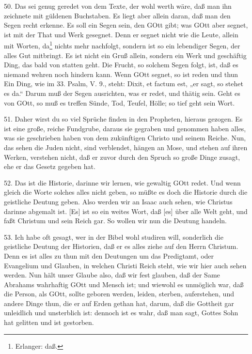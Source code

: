 50. Das sei genug geredet von dem Texte, der wohl werth wäre, daß man ihn zeichnete mit güldenen Buchstaben. Es liegt aber allein daran, daß man den Segen recht erkenne. Es soll ein Segen sein, den GOtt gibt; was GOtt aber segnet, ist mit der That und Werk gesegnet. Denn er segnet nicht wie die Leute, allein mit Worten, da\footnote{Erlanger: daß.} nichts mehr nachfolgt, sondern ist so ein lebendiger Segen, der alles Gut mitbringt. Es ist nicht ein Gruß allein, sondern ein Werk und geschäftig Ding, das bald von statten geht. Die Frucht, so solchem Segen folgt, ist, daß es niemand wehren noch hindern kann. Wenn GOtt segnet, so ist reden und thun Ein Ding, wie im 33. Psalm, V. 9., steht: Dixit, et factum est, „er sagt, so stehet es da.“ Darum muß der Segen ausrichten, was er redet, und thätig sein. Geht es von GOtt, so muß es treffen Sünde, Tod, Teufel, Hölle; so tief geht sein Wort.

51. Daher wirst du so viel Sprüche finden in den Propheten, hieraus gezogen. Es ist eine große, reiche Fundgrube, daraus sie gegraben und genommen haben alles, was sie geschrieben haben von dem zukünftigen Christo und seinem Reiche. Nun, das sehen die Juden nicht, sind verblendet, hängen an Mose, und stehen auf ihren Werken, verstehen nicht, daß er zuvor durch den Spruch so große Dinge zusagt, ehe er das Gesetz gegeben hat.

52. Das ist die Historie, darinne wir lernen, wie gewaltig GOtt redet. Und wenn gleich die Worte solches alles nicht geben, so müßte es doch die Historie durch die geistliche Deutung geben. Also werden wir an Isaac auch sehen, wie Christus darinne abgemalt ist. [Es] ist so ein weites Wort, daß [es] über alle Welt geht, und faßt Christum und sein Reich gar. So wollen wir nun die Deutung handeln.

53. Ich habe oft gesagt, wer in der Bibel wohl studiren will, sonderlich die geistliche Deutung der Historien, daß er es alles ziehe auf den Herrn Christum. Denn es ist alles zu thun mit den Deutungen um das Predigtamt, oder Evangelium und Glauben, in welchen Christi Reich steht, wie wir hier auch sehen werden. Nun hält unser Glaube also, daß wir fest glauben, daß der Same Abrahams wahrhaftig GOtt und Mensch ist; und wiewohl es unmöglich war, daß die Person, als GOtt, sollte geboren werden, leiden, sterben, auferstehen, und andere Dinge thun, die er auf Erden gethan hat, darum, daß
die Gottheit gar unleidlich und unsterblich ist: dennoch ist es wahr, daß man sagt, Gottes Sohn hat gelitten und ist gestorben.

